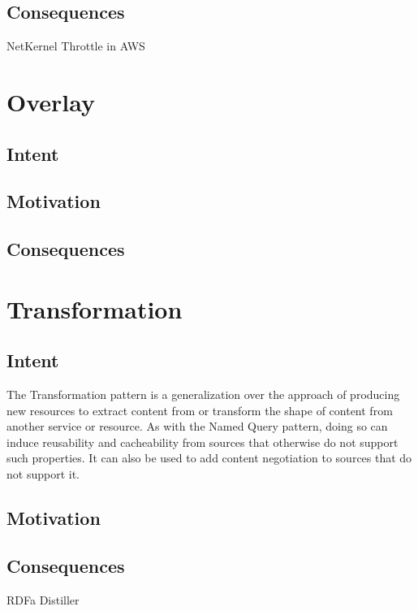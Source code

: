 \subsection{Consequences}
\label{ch02.sec.3.consequences}

NetKernel Throttle in AWS

\newpage
\section{Overlay}
\label{ch02.sec.4}

\subsection{Intent}
\label{ch02.sec.4.intent}

\subsection{Motivation}
\label{ch02.sec.4.motivation}

\subsection{Consequences}
\label{ch02.sec.4.consequences}

\newpage
\section{Transformation}
\label{ch02.sec.5}

\subsection{Intent}
\label{ch02.sec.5.intent}
The Transformation pattern is a generalization over the approach of producing new resources to extract content from or transform the shape of content from another service or resource. As with the Named Query pattern, doing so can induce reusability and cacheability from sources that otherwise do not support such properties. It can also be used to add content negotiation to sources that do not support it.

\subsection{Motivation}
\label{ch02.sec.5.motivation}

\subsection{Consequences}
\label{ch02.sec.5.consequences}

RDFa Distiller


